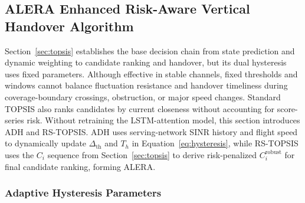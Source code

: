 \documentclass[remotesensing,article,submit,moreauthors]{Definitions/mdpi}
\begin{document}
\subsection{ALERA Enhanced Risk-Aware Vertical Handover Algorithm}\label{sec:alera}

Section~\ref{sec:topsis} establishes the base decision chain from state prediction and dynamic weighting to candidate ranking and handover, but its dual hysteresis uses fixed parameters. Although effective in stable channels, fixed thresholds and windows cannot balance fluctuation resistance and handover timeliness during coverage-boundary crossings, obstruction, or major speed changes. Standard TOPSIS also ranks candidates by current closeness without accounting for score-series risk. Without retraining the LSTM-attention model, this section introduces ADH and RS-TOPSIS. ADH uses serving-network SINR history and flight speed to dynamically update $\Delta_{\mathrm{th}}$ and $T_h$ in Equation~\eqref{eq:hysteresis}, while RS-TOPSIS uses the $C_i$ sequence from Section~\ref{sec:topsis} to derive risk-penalized $C_i^{\mathrm{robust}}$ for final candidate ranking, forming ALERA.

\subsubsection{Adaptive Hysteresis Parameters}\label{sec:adh}
\end{document}
